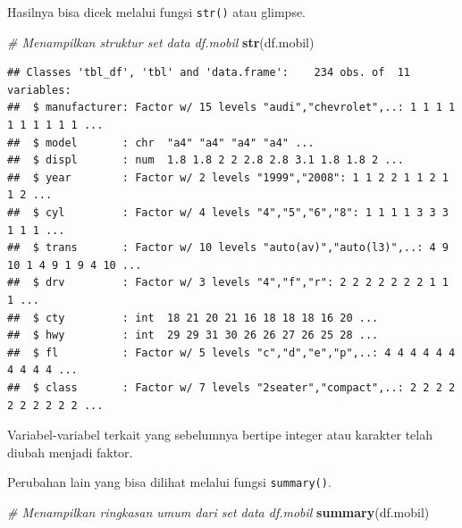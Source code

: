 \documentclass[openany]{book}
\newenvironment{Shaded}{\begin{snugshade}}{\end{snugshade}}
\newcommand{\KeywordTok}[1]{\textcolor[rgb]{0.13,0.29,0.53}{\textbf{#1}}}
\newcommand{\CommentTok}[1]{\textcolor[rgb]{0.56,0.35,0.01}{\textit{#1}}}
\newcommand{\NormalTok}[1]{#1}
\begin{document}
Hasilnya bisa dicek melalui fungsi \texttt{str()} atau glimpse.

\begin{Shaded}
\begin{Highlighting}[]
\CommentTok{# Menampilkan struktur set data df.mobil}
\KeywordTok{str}\NormalTok{(df.mobil)}
\end{Highlighting}
\end{Shaded}

\begin{verbatim}
## Classes 'tbl_df', 'tbl' and 'data.frame':    234 obs. of  11 variables:
##  $ manufacturer: Factor w/ 15 levels "audi","chevrolet",..: 1 1 1 1 1 1 1 1 1 1 ...
##  $ model       : chr  "a4" "a4" "a4" "a4" ...
##  $ displ       : num  1.8 1.8 2 2 2.8 2.8 3.1 1.8 1.8 2 ...
##  $ year        : Factor w/ 2 levels "1999","2008": 1 1 2 2 1 1 2 1 1 2 ...
##  $ cyl         : Factor w/ 4 levels "4","5","6","8": 1 1 1 1 3 3 3 1 1 1 ...
##  $ trans       : Factor w/ 10 levels "auto(av)","auto(l3)",..: 4 9 10 1 4 9 1 9 4 10 ...
##  $ drv         : Factor w/ 3 levels "4","f","r": 2 2 2 2 2 2 2 1 1 1 ...
##  $ cty         : int  18 21 20 21 16 18 18 18 16 20 ...
##  $ hwy         : int  29 29 31 30 26 26 27 26 25 28 ...
##  $ fl          : Factor w/ 5 levels "c","d","e","p",..: 4 4 4 4 4 4 4 4 4 4 ...
##  $ class       : Factor w/ 7 levels "2seater","compact",..: 2 2 2 2 2 2 2 2 2 2 ...
\end{verbatim}

Variabel-variabel terkait yang sebelumnya bertipe integer atau karakter
telah diubah menjadi faktor.

Perubahan lain yang bisa dilihat melalui fungsi \texttt{summary()}.

\begin{Shaded}
\begin{Highlighting}[]
\CommentTok{# Menampilkan ringkasan umum dari set data df.mobil}
\KeywordTok{summary}\NormalTok{(df.mobil)}
\end{Highlighting}
\end{Shaded}
\end{document}

